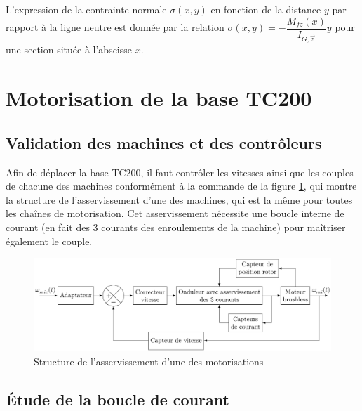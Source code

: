 L'expression de la contrainte normale $\sigma(x,y)$ en fonction de la distance $y$ par rapport à la ligne neutre est donnée par la relation $\sigma(x,y)=-\dfrac{M_{fz}(x)}{I_{G,\vec{z}}}y$ pour une section située à l'abscisse $x$.



\section{Motorisation de la base TC200}

\subsection{Validation des machines et des contrôleurs}

Afin de déplacer la base TC200, il faut contrôler les vitesses ainsi que les couples de chacune des machines conformément à la commande de la figure \ref{fig12}, qui montre la structure de l'asservissement d'une des machines,
qui est la même pour toutes les chaînes de motorisation. Cet asservissement nécessite une boucle interne de courant (en fait des 3 courants des enroulements de la machine) pour maîtriser également le couple.

\begin{figure}[!ht]
\begin{center}
 \includegraphics[width=0.8\linewidth]{img/fig12.png}
 \end{center}
  \caption{Structure de l'asservissement d'une des motorisations}
\label{fig12}
\end{figure}

\vspace{-0.5cm}


\subsection{Étude de la boucle de courant}

